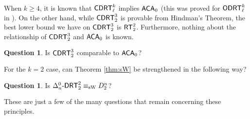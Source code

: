 \documentclass{amsart}
\theoremstyle{definition}
\newtheorem{question}[thm]{Question}
\theoremstyle{remark}
\newcommand{\system}[1]{\mbox{\fontfamily{cmss}\fontshape{n}\fontseries{m}%
    \selectfont#1}}
\newcommand{\RT}{\system{RT}}
\newcommand{\ACA}{\system{ACA}\ensuremath{_0}}
\newcommand{\DRT}{\system{DRT}}
\newcommand{\CDRT}{\system{CDRT}}
\newcommand{\cDRT}{\system{CDRT}}
\newcommand{\ODRT}{\system{ODRT}}
\begin{document}
When $k\geq 4$, it is known that $\CDRT^k_\ell$ implies $\ACA$ 
(this was proved for $\ODRT^k_\ell$ in \cite{ms}).
On the other hand, while $\cDRT^3_2$ is provable from 
Hindman's Theorem, the best lower bound we have 
on $\CDRT^3_2$ is $\RT^2_2$.  Furthermore, nothing about 
the relationship of $\CDRT^3_2$ and $\ACA$ is known.

\begin{question}
Is $\cDRT^3_2$ comparable to $\ACA$?
\end{question}

For the $k=2$ case, can Theorem \ref{thm:sW} be strengthened in the following way?

\begin{question}
Is $\Delta^0_n\text{-}\DRT^2_2  \equiv_{\mathrm{sW}}  D^n_2$?
\end{question}

These are just a few of the many questions that remain 
concerning these principles.



\end{document}
